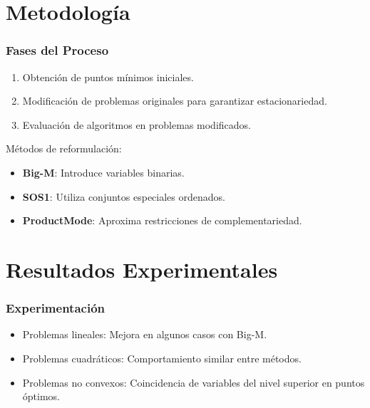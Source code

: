 \documentclass[10pt]{beamer}
\begin{document}
\section{Metodología}
\begin{frame}
\frametitle{Fases del Proceso}
\begin{enumerate}
    \item Obtención de puntos mínimos iniciales.
    \item Modificación de problemas originales para garantizar estacionariedad.
    \item Evaluación de algoritmos en problemas modificados.
\end{enumerate}
Métodos de reformulación:
\begin{itemize}
    \item \textbf{Big-M}: Introduce variables binarias.
    \item \textbf{SOS1}: Utiliza conjuntos especiales ordenados.
    \item \textbf{ProductMode}: Aproxima restricciones de complementariedad.
\end{itemize}
\end{frame}

\section{Resultados Experimentales}
\begin{frame}
\frametitle{Experimentación}
\begin{itemize}
    \item Problemas lineales: Mejora en algunos casos con Big-M.
    \item Problemas cuadráticos: Comportamiento similar entre métodos.
    \item Problemas no convexos: Coincidencia de variables del nivel superior en puntos óptimos.
\end{itemize}
\end{frame}

\end{document}
